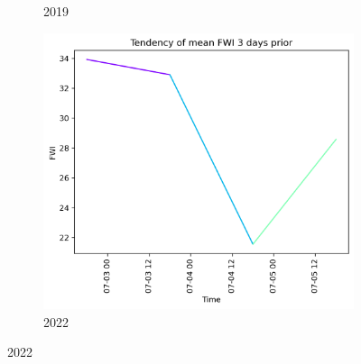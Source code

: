 \begin{figure}[h]
\begin{subfigure}{0.3\textwidth}
		\caption{2019}
		\label{fig:prior_3_days_2019}
	\end{subfigure}
	\hfill
	\begin{subfigure}{0.3\textwidth}
		\centering
		\includegraphics[width=\textwidth]{graphs/3days/2022_3daysprior_tendency_graph_FWI.png}
		\caption{2022}
		\label{fig:prior_3_days_2022}
	\end{subfigure}
	
	\label{fig:fwi_values_3days_prior}
\end{figure}

